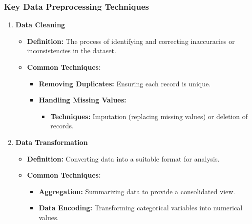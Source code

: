 \documentclass{beamer}
\begin{document}
\begin{frame}[fragile]
    \frametitle{Key Data Preprocessing Techniques}
    \begin{enumerate}
        \item \textbf{Data Cleaning}
        \begin{itemize}
            \item \textbf{Definition:} The process of identifying and correcting inaccuracies or inconsistencies in the dataset.
            \item \textbf{Common Techniques:}
            \begin{itemize}
                \item \textbf{Removing Duplicates:} Ensuring each record is unique.
                \item \textbf{Handling Missing Values:} 
                \begin{itemize}
                    \item \textbf{Techniques:} Imputation (replacing missing values) or deletion of records.
                \end{itemize}
            \end{itemize}
        \end{itemize}

        \item \textbf{Data Transformation}
        \begin{itemize}
            \item \textbf{Definition:} Converting data into a suitable format for analysis.
            \item \textbf{Common Techniques:}
            \begin{itemize}
                \item \textbf{Aggregation:} Summarizing data to provide a consolidated view.
                \item \textbf{Data Encoding:} Transforming categorical variables into numerical values.
            \end{itemize}
        \end{itemize}
    \end{enumerate}
\end{frame}
\end{document}
